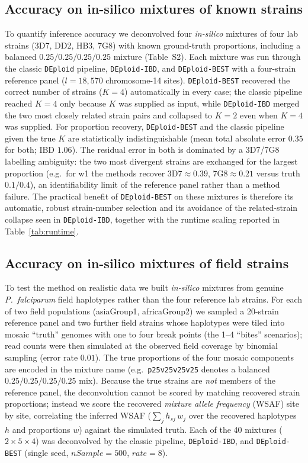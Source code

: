 \documentclass{article}
\begin{document}
\subsection{Accuracy on in-silico mixtures of known strains}

To quantify inference accuracy we deconvolved four \emph{in-silico} mixtures of
four lab strains (3D7, DD2, HB3, 7G8) with known ground-truth proportions,
including a balanced $0.25/0.25/0.25/0.25$ mixture (Table~S2). Each mixture was
run through the classic {\tt DEploid} pipeline, {\tt DEploid-IBD}, and
{\tt DEploid-BEST} with a four-strain reference panel
($l = 18{,}570$ chromosome-14 sites). {\tt DEploid-BEST} recovered the correct
number of strains ($K = 4$) automatically in every case; the classic pipeline
reached $K = 4$ only because $K$ was supplied as input, while {\tt DEploid-IBD}
merged the two most closely related strain pairs and collapsed to $K = 2$ even
when $K = 4$ was supplied. For proportion recovery, {\tt DEploid-BEST} and the
classic pipeline given the true $K$ are statistically indistinguishable (mean
total absolute error $0.35$ for both; IBD $1.06$). The residual error in both is
dominated by a 3D7/7G8 labelling ambiguity: the two most divergent strains are
exchanged for the largest proportion (e.g.\ for w1 the methods recover
3D7$\approx0.39$, 7G8$\approx0.21$ versus truth $0.1/0.4$), an identifiability
limit of the reference panel rather than a method failure. The practical benefit
of {\tt DEploid-BEST} on these mixtures is therefore its automatic, robust
strain-number selection and its avoidance of the related-strain collapse seen in
{\tt DEploid-IBD}, together with the runtime scaling reported in Table~\ref{tab:runtime}.


\subsection{Accuracy on in-silico mixtures of field strains}

To test the method on realistic data we built \emph{in-silico} mixtures from
genuine \emph{P.\ falciparum} field haplotypes rather than the four reference
lab strains. For each of two field populations (asiaGroup1, africaGroup2) we
sampled a 20-strain reference panel and two further field strains whose
haplotypes were tiled into mosaic ``truth'' genomes with one to four break
points (the 1--4 ``bites'' scenarios); read counts were then simulated at the
observed field coverage by binomial sampling (error rate $0.01$). The true
proportions of the four mosaic components are encoded in the mixture name
(e.g.\ \texttt{p25v25v25v25} denotes a balanced
$0.25/0.25/0.25/0.25$ mix). Because the true strains are \emph{not} members
of the reference panel, the deconvolution cannot be scored by matching
recovered strain proportions; instead we score the recovered \emph{mixture
allele frequency} (WSAF) site by site, correlating the inferred WSAF
($\sum_j h_{sj}\,w_j$ over the recovered haplotypes $h$ and proportions $w$)
against the simulated truth. Each of the 40 mixtures ($2 \times 5 \times 4$)
was deconvolved by the classic pipeline, {\tt DEploid-IBD}, and
{\tt DEploid-BEST} (single seed, $nSample=500$, $rate=8$).
\end{document}

